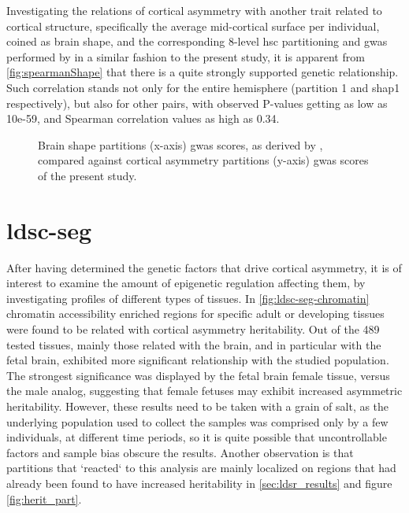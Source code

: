 Investigating the relations of cortical asymmetry with another trait related to cortical structure, specifically the average mid-cortical surface per individual, coined as brain shape, and the corresponding 8-level \ac{hsc} partitioning and \ac{gwas} performed by \citet{Naqvi2021} in a similar fashion to the present study, it is apparent from \autoref{fig:spearmanShape} that there is a quite strongly supported genetic relationship. Such correlation stands not only for the entire hemisphere (partition 1 and shap1 respectively), but also for other pairs, with observed P-values getting as low as 10e-59, and Spearman correlation values as high as 0.34.
\begin{figure}[H]
	\begin{adjustwidth}{-3cm}{-2.5cm}
		\par\medskip
	\end{adjustwidth}
		\caption[Brain shape genetically related to cortical asymmetry]{Brain shape partitions (x-axis) \ac{gwas} scores, as derived by \citet{Naqvi2021}, compared against cortical asymmetry partitions (y-axis) \ac{gwas} scores of the present study.}
		\label{fig:spearmanShape}
\end{figure}


\section{\acs{ldsc-seg}}
\label{sec:ldsc-seg}
After having determined the genetic factors that drive cortical asymmetry, it is of interest to examine the amount of epigenetic regulation affecting them, by investigating profiles of different types of tissues. In \autoref{fig:ldsc-seg-chromatin} chromatin accessibility enriched regions for specific adult or developing tissues were found to be related with cortical asymmetry heritability. Out of the 489 tested tissues, mainly those related with the brain, and in particular with the fetal brain, exhibited more significant relationship with the studied population. The strongest significance was displayed by the fetal brain female tissue, versus the male analog, suggesting that female fetuses may exhibit increased asymmetric heritability. However, these results need to be taken with a grain of salt, as the underlying population used to collect the samples was comprised only by a few individuals, at different time periods, so it is quite possible that uncontrollable factors and sample bias obscure the results. Another observation is that partitions that `reacted` to this analysis are mainly localized on regions that had already been found to have increased heritability in \autoref{sec:ldsr_results} and figure \autoref{fig:herit_part}.


